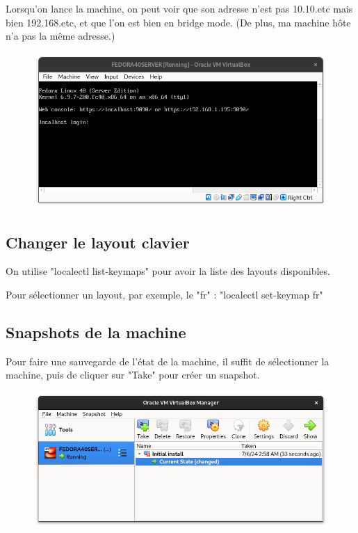 \documentclass{article}
\begin{document}
Lorsqu'on lance la machine, on peut voir que son adresse n'est pas 10.10.etc mais bien 192.168.etc, et que l'on est bien en bridge mode. (De plus, ma machine hôte n'a pas la même adresse.)

\begin{figure}[h!]
		\centering
		\includegraphics[width=1\textwidth]{vbox18.png}
\end{figure}

\pagebreak

\subsection{Changer le layout clavier}

On utilise "localectl list-keymaps" pour avoir la liste des layouts disponibles.

Pour sélectionner un layout, par exemple, le "fr" : "localectl set-keymap fr"



\subsection{Snapshots de la machine}

Pour faire une sauvegarde de l'état de la machine, il suffit de sélectionner la machine, puis de cliquer sur "Take" pour créer un snapshot.

\begin{figure}[h!]
		\centering
		\includegraphics[width=1\textwidth]{vbox19.png}
\end{figure}
\end{document}
